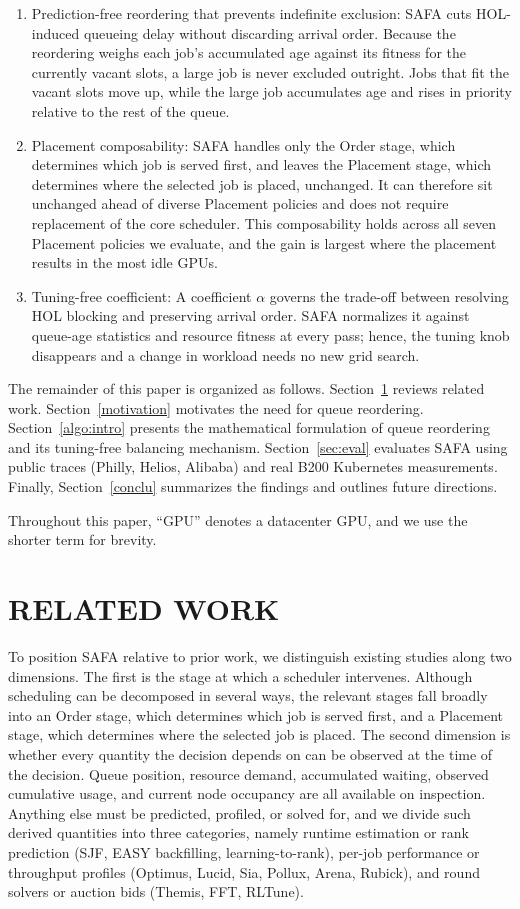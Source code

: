 \documentclass{ieeetj}
\begin{document}
\begin{enumerate}
\item Prediction-free reordering that prevents indefinite exclusion: SAFA cuts HOL-induced queueing delay without discarding arrival order. Because the reordering weighs each job's accumulated age against its fitness for the currently vacant slots, a large job is never excluded outright. Jobs that fit the vacant slots move up, while the large job accumulates age and rises in priority relative to the rest of the queue.
\item Placement composability: SAFA handles only the Order stage, which determines which job is served first, and leaves the Placement stage, which determines where the selected job is placed, unchanged. It can therefore sit unchanged ahead of diverse Placement policies and does not require replacement of the core scheduler. This composability holds across all seven Placement policies we evaluate, and the gain is largest where the placement results in the most idle GPUs.
\item Tuning-free coefficient: A coefficient $\alpha$ governs the trade-off between resolving HOL blocking and preserving arrival order. SAFA normalizes it against queue-age statistics and resource fitness at every pass; hence, the tuning knob disappears and a change in workload needs no new grid search.
\end{enumerate}

The remainder of this paper is organized as follows. Section~\ref{Related} reviews related work. Section~\ref{motivation} motivates the need for queue reordering. Section~\ref{algo:intro} presents the mathematical formulation of queue reordering and its tuning-free balancing mechanism. Section~\ref{sec:eval} evaluates SAFA using public traces (Philly, Helios, Alibaba) and real B200 Kubernetes measurements. Finally, Section~\ref{conclu} summarizes the findings and outlines future directions.

Throughout this paper, ``GPU'' denotes a datacenter GPU, and we use the shorter term for brevity.

\section{RELATED WORK}\label{Related}
To position SAFA relative to prior work, we distinguish existing studies along two dimensions. The first is the stage at which a scheduler intervenes. Although scheduling can be decomposed in several ways, the relevant stages fall broadly into an Order stage, which determines which job is served first, and a Placement stage, which determines where the selected job is placed. The second dimension is whether every quantity the decision depends on can be observed at the time of the decision. Queue position, resource demand, accumulated waiting, observed cumulative usage, and current node occupancy are all available on inspection. Anything else must be predicted, profiled, or solved for, and we divide such derived quantities into three categories, namely runtime estimation or rank prediction (SJF, EASY backfilling, learning-to-rank), per-job performance or throughput profiles (Optimus, Lucid, Sia, Pollux, Arena, Rubick), and round solvers or auction bids (Themis, FFT, RLTune).
\end{document}
